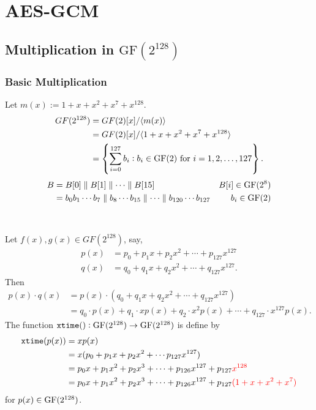 \chapter{AES-GCM}
\section{Multiplication in $\text{GF}(2^{128})$}
\subsection{Basic Multiplication}
Let $m(x):=1+x+x^2+x^7+x^{128}$.
\begin{align*}
	GF(2^{128})&=GF(2)[x]/\langle m(x)\rangle \\
	&=GF(2)[x]/\langle 1+x+x^2+x^7+x^{128}\rangle \\
	&=\set{\sum_{i=0}^{127}b_i:b_i\in\text{GF}(2)\ \text{for}\ i=1,2,\dots,127}.
\end{align*}
\begin{align*}
	B&=B[0]\parallel B[1]\parallel\cdots\parallel B[15]&B[i]\in\normalfont\text{GF}(2^{8})\\
	&=b_0b_1\cdots b_7\parallel b_8\cdots b_{15}\parallel \cdots\parallel b_{120}\cdots b_{127}&b_i\in\normalfont\text{GF}(2)
\end{align*} \\
\vspace{50pt}\\
Let $f(x),g(x)\in GF(2^{128})$, say, \begin{align*}
	p(x)&=p_0+p_1x+p_2x^2+\cdots+p_{127}x^{127}\\
	q(x)&=q_0+q_1x+q_2x^2+\cdots+q_{127}x^{127}.
\end{align*}
Then \begin{align*}
	p(x)\cdot q(x)&=p(x)\cdot\left(q_0+q_1x+q_2x^2+\cdots+q_{127}x^{127}\right)\\
	&=q_0\cdot p(x)+q_1\cdot xp(x)+q_2\cdot x^2p(x)+\cdots +q_{127}\cdot x^{127}p(x).
\end{align*}
\newpage\noindent
The function $\texttt{xtime}():\normalfont\text{GF}(2^{128})\to\normalfont\text{GF}(2^{128})$ is define by \begin{align*}
	\texttt{xtime}(p(x))&=xp(x)\\
	&=x(p_0+p_1x+p_2x^2+\cdots p_{127}x^{127}) \\
	&=p_0x+p_1x^2+p_2x^3+\cdots +p_{126}x^{127}+p_{127}\color{red}x^{128}\\
	&=p_0x+p_1x^2+p_2x^3+\cdots +p_{126}x^{127}+p_{127}\color{red}(1+x+x^2+x^7)
\end{align*} for $p(x)\in\normalfont\text{GF}(2^{128})$.
